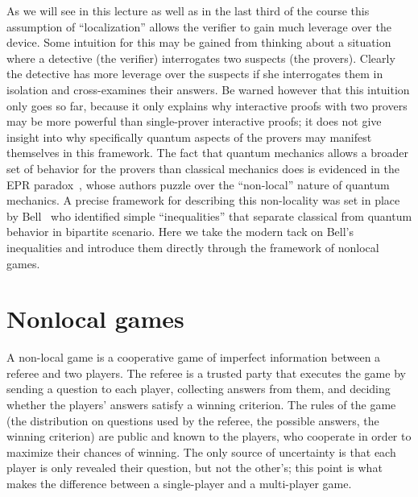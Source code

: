 As we will see in this lecture as well as in the last third of the course this assumption of ``localization'' allows the verifier to gain much leverage over the device. Some intuition for this may be gained from thinking about a situation where a detective (the verifier) interrogates two suspects (the provers). Clearly the detective has more leverage over the suspects if she interrogates them in isolation and cross-examines their answers. Be warned however that this intuition only goes so far, because it only explains why interactive proofs with two provers may be more powerful than single-prover interactive proofs; it does not give insight into why specifically quantum aspects of the provers may manifest themselves in this framework. The fact that quantum mechanics allows a broader set of behavior for the provers than classical mechanics does is evidenced in the EPR paradox~\cite{einstein1935can}, whose authors puzzle over the ``non-local'' nature of quantum mechanics. A precise framework for describing this non-locality was set in place by Bell~\cite{bell1964einstein} who identified simple ``inequalities'' that separate classical from quantum behavior in bipartite scenario. Here we take the modern tack on Bell's inequalities and introduce them directly through the framework of nonlocal games. 

\section{Nonlocal games}

A non-local game is a cooperative game of imperfect information between a referee and two players. The referee is a trusted party that executes the game by sending a question to each player, collecting answers from them, and deciding whether the players' answers satisfy a winning criterion. The rules of the game (the distribution on questions used by the referee, the possible answers, the winning criterion) are public and known to the players, who cooperate in order to maximize their chances of winning. The only source of uncertainty is that each player is only revealed their question, but not the other's; this point is what makes the difference between a single-player and a multi-player game. 


